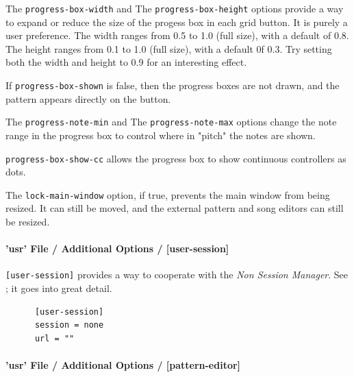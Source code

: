    The \texttt{progress-box-width} and
   The \texttt{progress-box-height} options provide a way to expand or reduce
   the size of the progess box in each grid button.
   It is purely a user preference.
   The width ranges from 0.5 to 1.0 (full size), with a default of 0.8.
   The height ranges from 0.1 to 1.0 (full size), with a default 0f 0.3.
   Try setting both the width and height to 0.9 for an interesting effect.


   If \texttt{progress-box-shown} is false, then the progress boxes are not
   drawn, and the pattern appears directly on the button.

   The \texttt{progress-note-min} and
   The \texttt{progress-note-max} options change the note range in the progress
   box to control where in "pitch" the notes are shown.

   \texttt{progress-box-show-cc} allows 
   the progress box to show continuous controllers as dots.

   The \texttt{lock-main-window} option, if true, prevents the main window from
   being resized.  It can still be moved, and the external pattern and song
   editors can still be resized.

\paragraph{'usr' File / Additional Options / [user-session]}
\label{paragraph:user_file_added_options_session}

   \texttt{[user-session]} provides a way to cooperate with the
   \textsl{Non Session Manager}.
   See ; it goes into great
   detail.

   \begin{verbatim}
      [user-session]
      session = none
      url = ""
   \end{verbatim}

\paragraph{'usr' File / Additional Options / [pattern-editor]}
\label{paragraph:user_file_added_options_pattern_editor}

